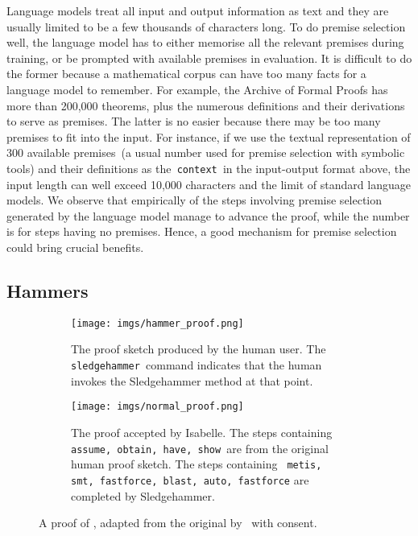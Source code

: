 \documentclass{article}
\begin{document}
Language models treat all input and output information as text and they are usually limited to be a few thousands of characters long. 
To do premise selection well, the language model has to either memorise all the relevant premises during training, or be prompted with available premises in evaluation. 
It is difficult to do the former because a mathematical corpus can have too many facts for a language model to remember.
For example, the Archive of Formal Proofs has more than 200,000 theorems, plus the numerous definitions and their derivations to serve as premises. 
The latter is no easier because there may be too many premises to fit into the input. 
For instance, if we use the textual representation of 300 available premises~(a usual number used for premise selection with symbolic tools) and their definitions as the\texttt{ context }in the input-output format above, the input length can well exceed 10,000 characters and the limit of standard language models.
We observe that empirically  of the steps involving premise selection generated by the language model manage to advance the proof, while the number is  for steps having no premises. Hence, a good mechanism for premise selection could bring crucial benefits.




\subsection{Hammers}
\label{subsec: hammer}

\begin{figure}[t]
\centering
\begin{subfigure}{0.4\linewidth}
  \centering
  \texttt{[image: imgs/hammer\_proof.png]}
  \caption{The proof sketch produced by the human user. The\texttt{ sledgehammer }command indicates that the human invokes the Sledgehammer method at that point.}
  \label{fig: hammer proof}
\end{subfigure}
\hfill
\begin{subfigure}{0.55\linewidth}
  \centering
  \texttt{[image: imgs/normal\_proof.png]}
  \caption{The proof accepted by Isabelle. The steps containing \texttt{assume, obtain, have, show }are from the original human proof sketch. The steps containing \texttt{ metis, smt, fastforce, blast, auto, fastforce} are completed by Sledgehammer.}
  \label{fig: orig proof}
\end{subfigure}
\caption{A proof of , adapted from the original by~\citet{li2021isarstep} with consent.}
\label{fig: whole proof}
\end{figure}
\end{document}
